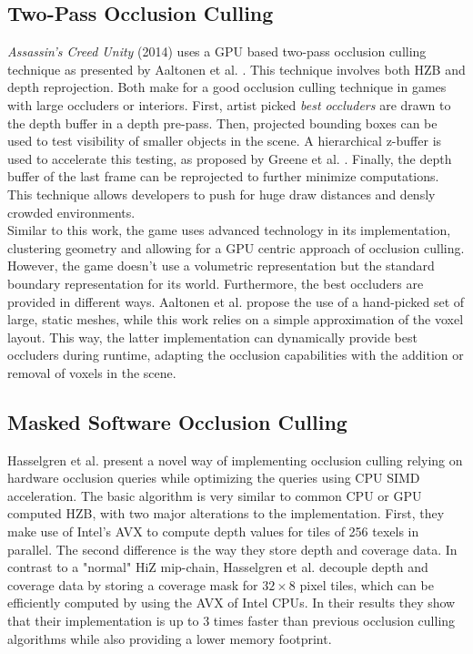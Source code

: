 \subsection*{Two-Pass Occlusion Culling}

\noindent
\emph{Assassin's Creed Unity} (2014) uses a \ac{GPU} based two-pass occlusion culling technique as presented by 
Aaltonen et al. \cite{Aaltonen2015}. This technique involves both \ac{HZB} and depth reprojection. Both make for 
a good occlusion culling technique in games with large occluders or interiors. First, artist picked 
\emph{best occluders} are drawn to the depth buffer in a depth pre-pass. Then, projected bounding boxes can be 
used to test visibility of smaller objects in the scene. A hierarchical z-buffer is used to accelerate this testing,
as proposed by Greene et al. \cite{Greene93,Greene95}. Finally, the depth buffer of the last frame can be 
reprojected to further minimize computations. This technique allows developers to push for huge draw distances and 
densly crowded environments.\\

\noindent
Similar to this work, the game uses advanced technology in its implementation, clustering geometry and allowing 
for a \ac{GPU} centric approach of occlusion culling. However, the game doesn't use a volumetric representation 
but the standard boundary representation for its world. Furthermore, the best occluders are provided in different 
ways. Aaltonen et al. \cite{Aaltonen2015} propose the use of a hand-picked set of large, static meshes, while this 
work relies on a simple approximation of the voxel layout. This way, the latter implementation can dynamically 
provide best occluders during runtime, adapting the occlusion capabilities with the addition or removal of voxels 
in the scene.


\subsection*{Masked Software Occlusion Culling}

Hasselgren et al. \cite{Hasselgren2016} present a novel way of implementing occlusion culling relying on hardware 
occlusion queries while optimizing the queries using \ac{CPU} \ac{SIMD} acceleration. The basic algorithm is very 
similar to common \ac{CPU} or \ac{GPU} computed \ac{HZB}, with two major alterations to the implementation. First, 
they make use of Intel's \ac{AVX} to compute depth values for tiles of 256 texels in parallel. The second difference 
is the way they store depth and coverage data. In contrast to a "normal" \ac{HiZ} mip-chain, Hasselgren et al. 
decouple depth and coverage data by storing a coverage mask for \begin{math}32 \times 8\end{math} pixel tiles, 
which can be efficiently computed by using the \ac{AVX} of Intel \ac{CPU}s. In their results they show that their 
implementation is up to 3 times faster than previous occlusion culling algorithms while also providing a lower 
memory footprint. \\

